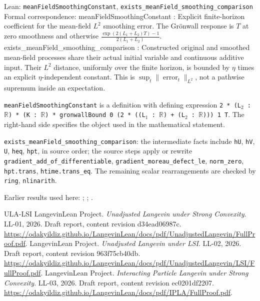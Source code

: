 \documentclass[11pt,a4paper]{report}
\begin{document}
\begin{leanbox}{Lean: \texttt{meanFieldSmoothingConstant}, \texttt{exists\_\allowbreak{}meanField\_\allowbreak{}smoothing\_\allowbreak{}comparison}}
Formal correspondence: meanFieldSmoothingConstant : Explicit finite-horizon coefficient for the mean-field \(L^2\) smoothing error. The Grönwall response is \(T\) at zero smoothness and otherwise \(\frac{\exp(2(L_1+L_2)T)-1}{2(L_1+L_2)}\). exists\_meanField\_smoothing\_comparison : Constructed original and smoothed mean-field processes share their actual initial variable and continuous additive input. Their \(L^2\) distance, uniformly over the finite horizon, is bounded by \(\eta\) times an explicit \(\eta\)-independent constant. This is \(\sup_t\|\operatorname{error}_t\|_{L^2}\), not a pathwise supremum inside an expectation.



\texttt{mean\allowbreak{}Field\allowbreak{}Smoothing\allowbreak{}Constant} is a definition with defining expression \texttt{2 * (L\ensuremath{{}_{2}} : \ensuremath{\mathbb R}) * (K : \ensuremath{\mathbb R}) * gronwall\allowbreak{}Bound 0 (2 * ((L\ensuremath{{}_{1}} : \ensuremath{\mathbb R}) + (L\ensuremath{{}_{2}} : \ensuremath{\mathbb R}))) 1 T}. The right-hand side specifies the object used in the mathematical statement.



\texttt{exists\_\allowbreak{}mean\allowbreak{}Field\_\allowbreak{}smoothing\_\allowbreak{}comparison}: the intermediate facts include \texttt{h\allowbreak{}U}, \texttt{h\allowbreak{}V}, \texttt{U}, \texttt{heq}, \texttt{hpt}, in source order; the source steps apply or rewrite \texttt{gradient\_\allowbreak{}add\_\allowbreak{}of\_\allowbreak{}differentiable}, \texttt{gradient\_\allowbreak{}moreau\_\allowbreak{}defect\_\allowbreak{}le}, \texttt{norm\_\allowbreak{}zero}, \texttt{hpt.\allowbreak{}trans}, \texttt{htime.\allowbreak{}trans\_\allowbreak{}eq}. The remaining scalar rearrangements are checked by \texttt{ring}, \texttt{nlinarith}.
\end{leanbox}


Earlier results used here: \cite[Section~3.13.2]{LangevinLean2026ULASC}; \cite[Section~3.13.3]{LangevinLean2026ULASC}; \cite[Section~3.1.1]{LangevinLean2026IPLA}.

\begin{thebibliography}{ULA-LSI}
LangevinLean Project. \emph{Unadjusted Langevin under Strong Convexity}. LL-01, 2026. Draft report, content revision d34ead06987c. \url{https://odakyildiz.github.io/LangevinLean/docs/pdf/UnadjustedLangevin/FullProof.pdf}.
LangevinLean Project. \emph{Unadjusted Langevin under LSI}. LL-02, 2026. Draft report, content revision 963f75cb40db. \url{https://odakyildiz.github.io/LangevinLean/docs/pdf/UnadjustedLangevin/LSI/FullProof.pdf}.
LangevinLean Project. \emph{Interacting Particle Langevin under Strong Convexity}. LL-03, 2026. Draft report, content revision ec0201df2207. \url{https://odakyildiz.github.io/LangevinLean/docs/pdf/IPLA/FullProof.pdf}.
\end{thebibliography}
\end{document}
